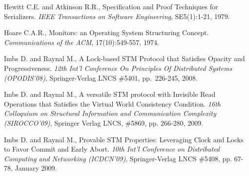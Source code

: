 \begin{thebibliography}{99}
{%
% 
% 
% 









 


Hewitt C.E. and Atkinson R.R., 
Specification and Proof Techniques for Serializers. 
{\it IEEE Transactions on Software Engineering}, SE5(1):1-21, 1979. 



Hoare C.A.R., 
Monitors: an Operating System Structuring Concept. 
{\it Communications of the  ACM}, 17(10):549-557, 1974. 




Imbs D. and Raynal M.,
A Lock-based STM Protocol  that Satisfies Opacity and Progressiveness. 
{\it 12th Int'l Conference On Principles Of Distributed Systems
(OPODIS'08)},   Springer-Verlag LNCS  \#5401, pp.~226-245, 2008. 


Imbs D. and Raynal M., 
A versatile   STM protocol with Invisible Read Operations
that Satisfies  the  Virtual World Consistency Condition.
{\it  16th  Colloquium   on  Structural   Information   and  Communication
Complexity  (SIROCCO'09)}, Springer Verlag LNCS,  \#5869,  pp. 266-280, 2009. 






Imbs D. and Raynal M.,
Provable STM Properties: Leveraging Clock and Locks to Favor Commit 
and Early Abort.
{\it 10th Int'l Conference on Distributed Computing and  Networking
(ICDCN'09)},  Springer-Verlag LNCS  \#5408, pp. 67-78, January 2009. 

}
\end{thebibliography}
